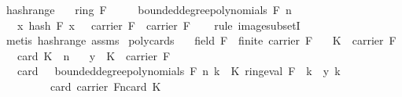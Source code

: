 \begin{isabellebody}
{\isafoldproof}%
%
\isadelimproof
\isanewline
%
\endisadelimproof
\isanewline
{}\isamarkupfalse%
\ hash{\isacharunderscore}{\kern0pt}range{\isacharunderscore}{\kern0pt}{}{\isacharcolon}{\kern0pt}\isanewline
\ \ \ {\isachardoublequoteopen}ring\ F{\isachardoublequoteclose}\isanewline
\ \ \ {\isachardoublequoteopen}{\isasymomega}\ {\isasymin}\ bounded{\isacharunderscore}{\kern0pt}degree{\isacharunderscore}{\kern0pt}polynomials\ F\ n{\isachardoublequoteclose}\isanewline
\ \ \ {\isachardoublequoteopen}{\isacharparenleft}{\kern0pt}{\isasymlambda}x{\isachardot}{\kern0pt}\ hash\ F\ x\ {\isasymomega}{\isacharparenright}{\kern0pt}\ {\isacharbackquote}{\kern0pt}\ carrier\ F\ {\isasymsubseteq}\ carrier\ F{\isachardoublequoteclose}\isanewline
%
\isadelimproof
\ \ %
\endisadelimproof
%
\isatagproof
{}\isamarkupfalse%
\ {\isacharparenleft}{\kern0pt}rule\ image{\isacharunderscore}{\kern0pt}subsetI{\isacharparenright}{\kern0pt}\isanewline
\ \ \isamarkupfalse%
\ {\isacharparenleft}{\kern0pt}metis\ hash{\isacharunderscore}{\kern0pt}range\ assms{\isacharparenright}{\kern0pt}%
\endisatagproof
{\isafoldproof}%
%
\isadelimproof
\isanewline
%
\endisadelimproof
\isanewline
{}\isamarkupfalse%
\ poly{\isacharunderscore}{\kern0pt}cards{\isacharcolon}{\kern0pt}\isanewline
\ \ \ {\isachardoublequoteopen}field\ F\ {\isasymand}\ finite\ {\isacharparenleft}{\kern0pt}carrier\ F{\isacharparenright}{\kern0pt}{\isachardoublequoteclose}\isanewline
\ \ \ {\isachardoublequoteopen}K\ {\isasymsubseteq}\ carrier\ F{\isachardoublequoteclose}\isanewline
\ \ \ {\isachardoublequoteopen}card\ K\ {\isasymle}\ n{\isachardoublequoteclose}\isanewline
\ \ \ {\isachardoublequoteopen}y\ {\isacharbackquote}{\kern0pt}\ K\ {\isasymsubseteq}\ {\isacharparenleft}{\kern0pt}carrier\ F{\isacharparenright}{\kern0pt}{\isachardoublequoteclose}\isanewline
\ \ \ {\isachardoublequoteopen}card\ {\isacharbraceleft}{\kern0pt}{\isasymomega}\ {\isasymin}\ bounded{\isacharunderscore}{\kern0pt}degree{\isacharunderscore}{\kern0pt}polynomials\ F\ n{\isachardot}{\kern0pt}\ {\isacharparenleft}{\kern0pt}{\isasymforall}k\ {\isasymin}\ K{\isachardot}{\kern0pt}\ ring{\isachardot}{\kern0pt}eval\ F\ {\isasymomega}\ k\ {\isacharequal}{\kern0pt}\ y\ k{\isacharparenright}{\kern0pt}{\isacharbraceright}{\kern0pt}\ {\isacharequal}{\kern0pt}\ \isanewline
\ \ \ \ \ \ \ \ \ card\ {\isacharparenleft}{\kern0pt}carrier\ F{\isacharparenright}{\kern0pt}{\isacharcircum}{\kern0pt}{\isacharparenleft}{\kern0pt}n{\isacharminus}{\kern0pt}card\ K{\isacharparenright}{\kern0pt}{\isachardoublequoteclose}\isanewline

\end{isabellebody}
